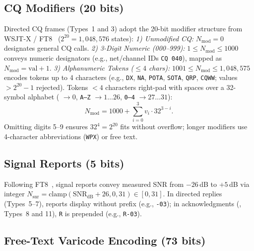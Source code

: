 {%
\subsection{CQ Modifiers (20 bits)}
\label{sec:modifier}

Directed CQ frames (Types~1 and 3) adopt the 20-bit modifier structure from WSJT-X / FT8~\cite{ft8,wsjtx} ($2^{20} = 1{,}048{,}576$ states):
\emph{1) Unmodified CQ:} $N_{\text{mod}} = 0$ designates general CQ calls.
\emph{2) 3-Digit Numeric (000--999):} $1 \le N_{\text{mod}} \le 1000$ conveys numeric designators (e.g., net/channel IDs \texttt{CQ 040}), mapped as $N_{\text{mod}} = \text{val} + 1$.
\emph{3) Alphanumeric Tokens ($\le 4$ chars):} $1001 \le N_{\text{mod}} \le 1{,}048{,}575$ encodes tokens up to 4 characters (e.g., \texttt{DX}, \texttt{NA}, \texttt{POTA}, \texttt{SOTA}, \texttt{QRP}, \texttt{CQWW}; values $> 2^{20}-1$ rejected). Tokens $< 4$ characters right-pad with spaces over a 32-symbol alphabet (\textvisiblespace{} $\to 0$, \texttt{A--Z} $\to 1\dots 26$, \texttt{0--4} $\to 27\dots 31$):
\begin{equation}
  N_{\text{mod}} = 1000 + \sum_{i=0}^{3} v_i \cdot 32^{3-i}.
\label{eq:modifier}
\end{equation}
Omitting digits 5--9 ensures $32^4 = 2^{20}$ fits without overflow; longer modifiers use 4-character abbreviations (\texttt{WPX}) or free text.

\subsection{Signal Reports (5 bits)}
\label{sec:rst}

Following FT8~\cite{ft8}, signal reports convey measured SNR from $-26$\,dB to $+5$\,dB via integer $N_{\text{snr}} = \text{clamp}(\text{SNR}_{\text{dB}} + 26, 0, 31) \in [0, 31]$. In directed  replies (Types~5--7), reports display without prefix (e.g., \texttt{-03}); in acknowledgments (, Types~8 and 11), \texttt{R} is prepended (e.g., \texttt{R-03}).

\subsection{Free-Text Varicode Encoding (73 bits)}
\label{sec:varicode}

}
